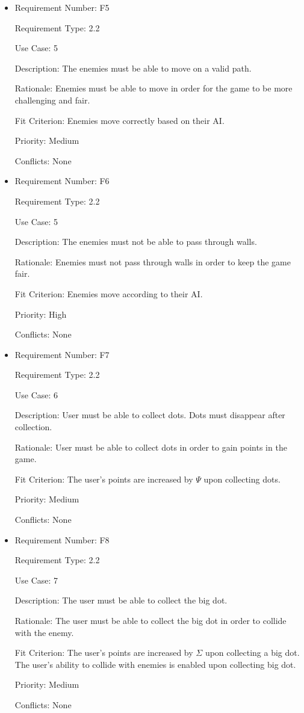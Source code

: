 \documentclass[12pt, titlepage]{article}
\begin{document}
\begin{itemize}
\item
Requirement Number: \hypertarget{f5}{F5}

Requirement Type: 2.2

Use Case: 5

Description: The enemies must be able to move on a valid path.

Rationale: Enemies must be able to move in order for the game to be more challenging and fair.

Fit Criterion: Enemies move correctly based on their AI.

Priority: Medium

Conflicts: None
\end{itemize}

\begin{itemize}
\item
Requirement Number: \hypertarget{f6}{F6}

Requirement Type: 2.2

Use Case: 5

Description: The enemies must not be able to pass through walls.

Rationale: Enemies must not pass through walls in order to keep the game fair.

Fit Criterion: Enemies move according to their AI.

Priority: High

Conflicts: None
\end{itemize}

\begin{itemize}
\item
Requirement Number: \hypertarget{f7}{F7}

Requirement Type: 2.2

Use Case: 6

Description: User must be able to collect dots. Dots must disappear after collection.

Rationale: User must be able to collect dots in order to gain points in the game.

Fit Criterion: The user's points are increased by $\hyperref[tab:constants]{\Psi}$ upon collecting dots.

Priority: Medium

Conflicts: None
\end{itemize}

\begin{itemize}
\item
Requirement Number: \hypertarget{f8}{F8}

Requirement Type: 2.2

Use Case: 7

Description: The user must be able to collect the big dot.

Rationale: The user must be able to collect the big dot in order to collide with the enemy.

Fit Criterion: The user's points are increased by $\hyperref[tab:constants]{\Sigma}$ upon collecting a big dot. The user's ability to collide with enemies is enabled upon collecting big dot.

Priority: Medium

Conflicts: None
\end{itemize}
\end{document}
